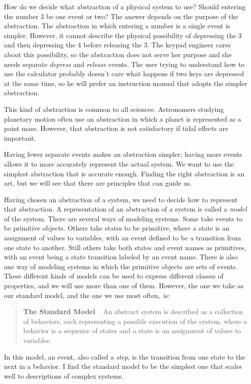 \documentclass[fleqn,leqno]{article}
\begin{document}
How do we decide what abstraction of a physical system to use?  Should
entering the number 3 be one event or two?  The answer depends on the
purpose of the abstraction.  The abstraction in which entering a
number is a single event is simpler.  However, it cannot describe the
physical possibility of depressing the 3 and then depressing the 4
before releasing the 3.  The keypad engineer cares about this
possibility, so the abstraction does not serve her purpose and she
needs separate \emph{depress} and \emph{release} events.  The user
trying to understand how to use the calculator probably doesn't care
what happens if two keys are depressed at the same time, so he will
prefer an instruction manual that adopts the simpler abstraction.

This kind of abstraction is common to all sciences.  Astronomers
studying planetary motion often use an abstraction in which a
planet is represented as a point mass.  However, that abstraction is not
satisfactory if tidal effects are important.  

Having fewer separate events makes an abstraction simpler; having more
events allows it to more accurately represent the actual system.  We
want to use the simplest abstraction that is accurate enough.  Finding
the right abstraction is an art, but we will see that there are
principles that can guide us.

Having chosen an abstraction of a system, we need to decide how to
represent that abstraction.  A representation of an abstraction of a
system is called a 
\emph{model} of the system.  There are several ways
of modeling systems.  Some take events to be primitive objects.
Others take states to be primitive, where a state is an assignment of
values to variables, with an event defined to be a transition from one
state to another.  Still others take both states and event names as
primitives, with an event being a state transition labeled by an event
name.  There is also one way of modeling systems in which the
primitive objects are sets of events.  These different kinds of models
can be used to express different classes of properties, and we will
use more than one of them.  However, the one we take as our standard
model, and the one we use most often,~is:
\begin{quote}
\textbf{The Standard Model} \  
An 
abstract system is described as a collection of behaviors, each
representing a possible execution of the system, where a 
behavior is a
sequence of states and a 
state is an assignment of values to
variables.
\end{quote}
In this model, an 
event, also called a 
\emph{step}, is the transition from one state to the next in a
behavior.  I find the standard model to be the simplest one that
scales well to descriptions of complex systems.
\end{document}
